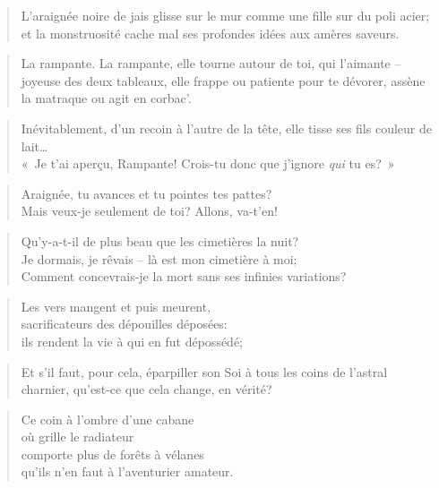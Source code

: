   \begin{verse}
    L’araignée noire de jais glisse sur le mur
    comme une fille sur du poli acier;\\
    et la monstruosité cache mal ses profondes idées aux amères saveurs.
  \end{verse}
  \begin{verse}
    La rampante. La rampante, elle tourne autour de toi, qui l’aimante --
    joyeuse des deux tableaux, elle frappe ou patiente pour te dévorer,
    assène la matraque ou agit en corbac’.
  \end{verse}
  \begin{verse}
    Inévitablement, d’un recoin à l’autre de la tête, elle tisse ses fils couleur de lait…\\
    «~Je t’ai aperçu, Rampante! Crois-tu donc que j’ignore \emph{qui} tu es?~»
  \end{verse}
  \begin{verse}
    Araignée, tu avances et tu pointes tes pattes?\\
    Mais veux-je seulement de toi? Allons, va-t’en!
  \end{verse}
  \begin{verse}
    Qu’y-a-t-il de plus beau que les cimetières la nuit?\\
    Je dormais, je rêvais -- là est mon cimetière à moi;\\
    Comment concevrais-je la mort sans ses infinies variations?
  \end{verse}
  \begin{verse}
    Les vers mangent et puis meurent,\\
    sacrificateurs des dépouilles déposées:\\
    ils rendent la vie à qui en fut dépossédé;
  \end{verse}
  \begin{verse}
    Et  s’il faut,  pour  cela, éparpiller  son  Soi à  tous  les coins  de
    l’astral charnier, qu’est-ce que cela change, en vérité?
  \end{verse}
  \begin{verse}
    Ce coin à l’ombre d’une cabane\\
    où grille le radiateur\\
    comporte plus de forêts à vélanes\\
    qu’ils n’en faut à l’aventurier amateur.
  \end{verse}
